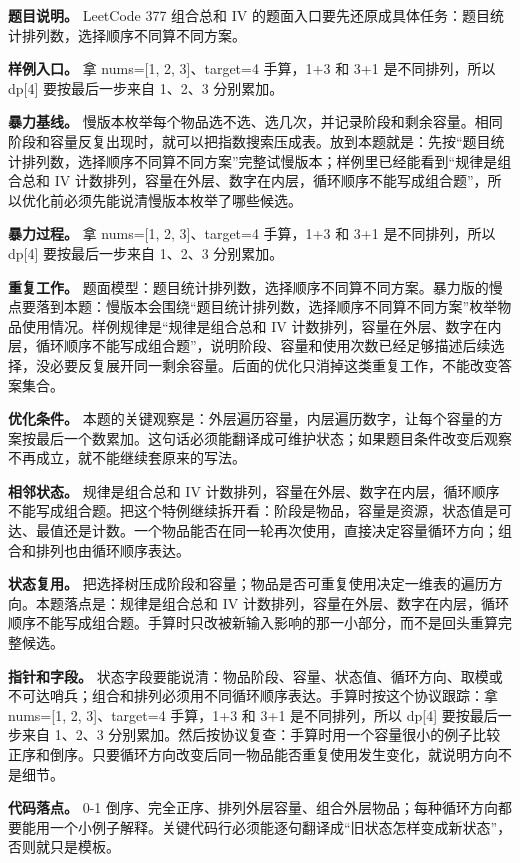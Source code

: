 \textbf{题目说明。} LeetCode 377 组合总和 IV 的题面入口要先还原成具体任务：题目统计排列数，选择顺序不同算不同方案。

\textbf{样例入口。} 拿 nums=[1, 2, 3]、target=4 手算，1+3 和 3+1 是不同排列，所以 dp[4] 要按最后一步来自 1、2、3 分别累加。

\textbf{暴力基线。} 慢版本枚举每个物品选不选、选几次，并记录阶段和剩余容量。相同阶段和容量反复出现时，就可以把指数搜索压成表。放到本题就是：先按“题目统计排列数，选择顺序不同算不同方案”完整试慢版本；样例里已经能看到“规律是组合总和 IV 计数排列，容量在外层、数字在内层，循环顺序不能写成组合题”，所以优化前必须先能说清慢版本枚举了哪些候选。

\textbf{暴力过程。} 拿 nums=[1, 2, 3]、target=4 手算，1+3 和 3+1 是不同排列，所以 dp[4] 要按最后一步来自 1、2、3 分别累加。

\textbf{重复工作。} 题面模型：题目统计排列数，选择顺序不同算不同方案。暴力版的慢点要落到本题：慢版本会围绕“题目统计排列数，选择顺序不同算不同方案”枚举物品使用情况。样例规律是“规律是组合总和 IV 计数排列，容量在外层、数字在内层，循环顺序不能写成组合题”，说明阶段、容量和使用次数已经足够描述后续选择，没必要反复展开同一剩余容量。后面的优化只消掉这类重复工作，不能改变答案集合。

\textbf{优化条件。} 本题的关键观察是：外层遍历容量，内层遍历数字，让每个容量的方案按最后一个数累加。这句话必须能翻译成可维护状态；如果题目条件改变后观察不再成立，就不能继续套原来的写法。

\textbf{相邻状态。} 规律是组合总和 IV 计数排列，容量在外层、数字在内层，循环顺序不能写成组合题。把这个特例继续拆开看：阶段是物品，容量是资源，状态值是可达、最值还是计数。一个物品能否在同一轮再次使用，直接决定容量循环方向；组合和排列也由循环顺序表达。

\textbf{状态复用。} 把选择树压成阶段和容量；物品是否可重复使用决定一维表的遍历方向。本题落点是：规律是组合总和 IV 计数排列，容量在外层、数字在内层，循环顺序不能写成组合题。手算时只改被新输入影响的那一小部分，而不是回头重算完整候选。

\textbf{指针和字段。} 状态字段要能说清：物品阶段、容量、状态值、循环方向、取模或不可达哨兵；组合和排列必须用不同循环顺序表达。手算时按这个协议跟踪：拿 nums=[1, 2, 3]、target=4 手算，1+3 和 3+1 是不同排列，所以 dp[4] 要按最后一步来自 1、2、3 分别累加。然后按协议复查：手算时用一个容量很小的例子比较正序和倒序。只要循环方向改变后同一物品能否重复使用发生变化，就说明方向不是细节。

\textbf{代码落点。} 0-1 倒序、完全正序、排列外层容量、组合外层物品；每种循环方向都要能用一个小例子解释。关键代码行必须能逐句翻译成“旧状态怎样变成新状态”，否则就只是模板。

